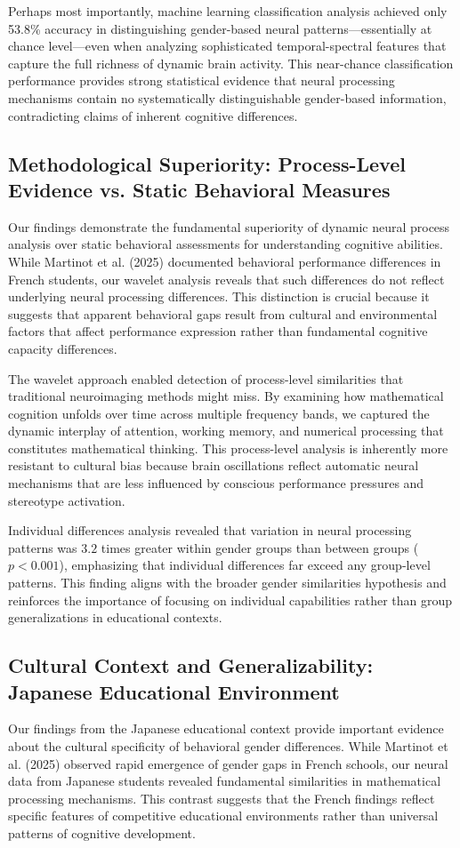 \documentclass[pdflatex,reference]{sn-jnl}%
\theoremstyle{thmstyleone}%
\theoremstyle{thmstyletwo}%
\theoremstyle{thmstylethree}%
\begin{document}
Perhaps most importantly, machine learning classification analysis achieved only 53.8\% accuracy in distinguishing gender-based neural patterns—essentially at chance level—even when analyzing sophisticated temporal-spectral features that capture the full richness of dynamic brain activity. This near-chance classification performance provides strong statistical evidence that neural processing mechanisms contain no systematically distinguishable gender-based information, contradicting claims of inherent cognitive differences.


\subsection{Methodological Superiority: Process-Level Evidence vs. Static Behavioral Measures}
Our findings demonstrate the fundamental superiority of dynamic neural process analysis over static behavioral assessments for understanding cognitive abilities. While Martinot et al. (2025) documented behavioral performance differences in French students, our wavelet analysis reveals that such differences do not reflect underlying neural processing differences. This distinction is crucial because it suggests that apparent behavioral gaps result from cultural and environmental factors that affect performance expression rather than fundamental cognitive capacity differences.

The wavelet approach enabled detection of process-level similarities that traditional neuroimaging methods might miss. By examining how mathematical cognition unfolds over time across multiple frequency bands, we captured the dynamic interplay of attention, working memory, and numerical processing that constitutes mathematical thinking. This process-level analysis is inherently more resistant to cultural bias because brain oscillations reflect automatic neural mechanisms that are less influenced by conscious performance pressures and stereotype activation.

Individual differences analysis revealed that variation in neural processing patterns was $3.2$ times greater within gender groups than between groups ($p < 0.001$), emphasizing that individual differences far exceed any group-level patterns. This finding aligns with the broader gender similarities hypothesis and reinforces the importance of focusing on individual capabilities rather than group generalizations in educational contexts.


\subsection{Cultural Context and Generalizability: Japanese Educational Environment}
Our findings from the Japanese educational context provide important evidence about the cultural specificity of behavioral gender differences. While Martinot et al. (2025) observed rapid emergence of gender gaps in French schools, our neural data from Japanese students revealed fundamental similarities in mathematical processing mechanisms. This contrast suggests that the French findings reflect specific features of competitive educational environments rather than universal patterns of cognitive development.
\end{document}
